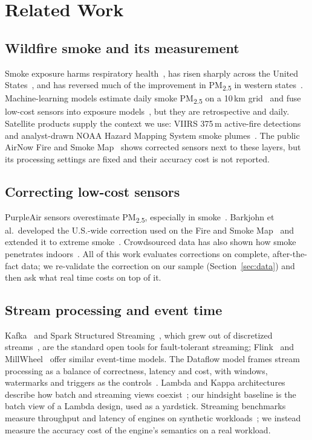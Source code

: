 \documentclass[10pt,journal,compsoc]{IEEEtran}
\begin{document}
\section{Related Work}\label{sec:related}
\subsection{Wildfire smoke and its measurement}
Smoke exposure harms respiratory health~\cite{reid2016}, has risen sharply across the United States~\cite{burke2021}, and has reversed much of the improvement in PM\textsubscript{2.5} in western states~\cite{burke2023}. Machine-learning models estimate daily smoke PM\textsubscript{2.5} on a 10\,km grid~\cite{childs2022} and fuse low-cost sensors into exposure models~\cite{bi2020}, but they are retrospective and daily. Satellite products supply the context we use: VIIRS 375\,m active-fire detections~\cite{schroeder2014} and analyst-drawn NOAA Hazard Mapping System smoke plumes~\cite{rolph2009}. The public AirNow Fire and Smoke Map~\cite{firemap} shows corrected sensors next to these layers, but its processing settings are fixed and their accuracy cost is not reported.

\subsection{Correcting low-cost sensors}
PurpleAir sensors overestimate PM\textsubscript{2.5}, especially in smoke~\cite{holder2020,delp2020}. Barkjohn et al.\ developed the U.S.-wide correction used on the Fire and Smoke Map~\cite{barkjohn2021} and extended it to extreme smoke~\cite{barkjohn2022}. Crowdsourced data has also shown how smoke penetrates indoors~\cite{liang2021}. All of this work evaluates corrections on complete, after-the-fact data; we re-validate the correction on our sample (Section~\ref{sec:data}) and then ask what real time costs on top of it.

\subsection{Stream processing and event time}
Kafka~\cite{kreps2011} and Spark Structured Streaming~\cite{armbrust2018}, which grew out of discretized streams~\cite{zaharia2013}, are the standard open tools for fault-tolerant streaming; Flink~\cite{carbone2015} and MillWheel~\cite{akidau2013} offer similar event-time models. The Dataflow model frames stream processing as a balance of correctness, latency and cost, with windows, watermarks and triggers as the controls~\cite{akidau2015dataflow}. Lambda and Kappa architectures describe how batch and streaming views coexist~\cite{marz2015,kreps2014}; our hindsight baseline is the batch view of a Lambda design, used as a yardstick. Streaming benchmarks measure throughput and latency of engines on synthetic workloads~\cite{chintapalli2016,karimov2018}; we instead measure the accuracy cost of the engine's semantics on a real workload.
\end{document}
